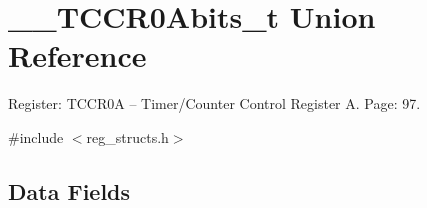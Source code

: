 \hypertarget{union_____t_c_c_r0_abits__t}{\section{\+\_\+\+\_\+\+T\+C\+C\+R0\+Abits\+\_\+t Union Reference}
\label{union_____t_c_c_r0_abits__t}
}


Register\+: T\+C\+C\+R0\+A -- Timer/\+Counter Control Register A. Page\+: 97.  




{\ttfamily \#include $<$reg\+\_\+structs.\+h$>$}

\subsection*{Data Fields}
